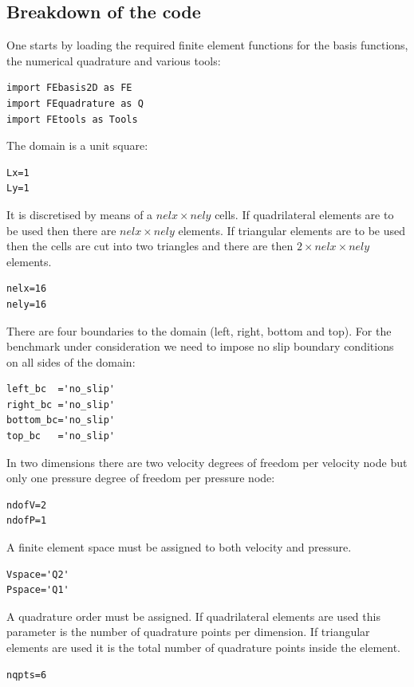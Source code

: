 \newpage
\subsection*{Breakdown of the code}

One starts by loading the required finite element functions 
for the basis functions, the numerical quadrature and various tools:
\begin{lstlisting}
import FEbasis2D as FE
import FEquadrature as Q
import FEtools as Tools 
\end{lstlisting}

The domain is a unit square:
\begin{lstlisting}
Lx=1
Ly=1
\end{lstlisting}

It is discretised by means of a $nelx\times nely$ cells. If quadrilateral 
elements are to be used then there are $nelx\times nely$ elements. If 
triangular elements are to be used then the cells are cut into two 
triangles and there are then $2\times nelx\times nely$ elements.

\begin{lstlisting}
nelx=16
nely=16
\end{lstlisting}

There are four boundaries to the domain (left, right, bottom and top). For the 
benchmark under consideration we need to impose no slip boundary conditions 
on all sides of the domain:
\begin{lstlisting}
left_bc  ='no_slip'
right_bc ='no_slip'
bottom_bc='no_slip'
top_bc   ='no_slip'
\end{lstlisting}

In two dimensions there are two velocity degrees of freedom per 
velocity node but only one pressure degree of freedom per pressure node:
\begin{lstlisting}
ndofV=2
ndofP=1
\end{lstlisting}

A finite element space must be assigned to both velocity and pressure. 
\begin{lstlisting}
Vspace='Q2'
Pspace='Q1'
\end{lstlisting}

A quadrature order must be assigned. If quadrilateral elements are used
this parameter is the number of quadrature points per dimension. 
If triangular elements are used it is the total number of quadrature points 
inside the element.  
\begin{lstlisting}
nqpts=6
\end{lstlisting}

